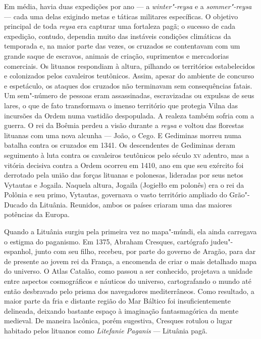 Em média, havia duas expedições por ano --- a \textit{winter"-reysa} e a
\textit{sommer"-reysa} --- cada uma delas exigindo metas e táticas militares
específicas. O objetivo principal de toda \textit{reysa} era capturar uma
fortaleza pagã; o sucesso de cada expedição, contudo, dependia muito das
instáveis condições climáticas da temporada e, na maior parte das vezes,
os cruzados se contentavam com um grande saque de escravos, animais de
criação, suprimentos e mercadorias comerciais. Os lituanos respondiam à
altura, pilhando os territórios estabelecidos e colonizados pelos
cavaleiros teutônicos. Assim, apesar do ambiente de concurso e
espetáculo, os ataques dos cruzados não terminavam sem consequências
fatais. Um sem"-número de pessoas eram assassinadas, escravizadas ou
expulsas de seus lares, o que de fato transformava o imenso território
que protegia Vilna das incursões da Ordem numa vastidão despopulada. A
realeza também sofria com a guerra. O rei da Boêmia perdeu a visão
durante a \textit{reysa} e voltou das florestas lituanas com uma nova
alcunha --- João, o Cego. E Gediminas morreu numa batalha contra os
cruzados em 1341. Os descendentes de Gediminas deram seguimento à luta
contra os cavaleiros teutônicos pelo século \textsc{xv} adentro, mas a vitória
decisiva contra a Ordem ocorreu em 1410, ano em que seu exército foi
derrotado pela união das forças lituanas e polonesas, lideradas por seus
netos Vytautas e Jogaila. Naquela altura, Jogaila (Jogiełło em polonês)
era o rei da Polônia e seu primo, Vytautas, governava o vasto território
ampliado do Grão"-Ducado da Lituânia. Reunidos, ambos os países criaram
uma das maiores potências da Europa.

\asterisc

Quando a Lituânia surgiu pela primeira vez no mapa"-múndi, ela ainda
carregava o estigma do paganismo. Em 1375, Abraham Cresques, cartógrafo
judeu"-espanhol, junto com seu filho, recebeu, por parte do governo de
Aragão, para dar de presente ao jovem rei da França, a encomenda de
criar o mais detalhado mapa do universo. O Atlas Catalão, como passou a
ser conhecido, projetava a unidade entre aspectos cosmográficos e
náuticos do universo, cartografando o mundo até então desbravado pelo
prisma dos navegadores mediterrâneos. Como resultado, a maior parte da
fria e distante região do Mar Báltico foi insuficientemente delineada,
deixando bastante espaço à imaginação fantasmagórica da mente medieval.
De maneira lacônica, porém sugestiva, Cresques rotulou o lugar habitado
pelos lituanos como \textit{Litefanie Paganis} --- Lituânia pagã.

